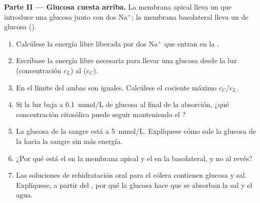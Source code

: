 \begin{problem}
\medskip
\noindent\textbf{Parte II --- Glucosa cuesta arriba.}
La membrana apical lleva un  que introduce una glucosa junto con
dos $\mathrm{Na^+}$; la membrana basolateral lleva un  de
glucosa ().
\begin{enumerate}[resume]
  \item Calcúlese la energía libre liberada por dos $\mathrm{Na^+}$ que
        entran en la .
  \item Escríbase la energía libre necesaria para llevar una glucosa desde
        la luz (concentración $c_L$) al  ($c_C$).
  \item En el límite del  ambas son iguales. Calcúlese el
        cociente máximo $c_C/c_L$.
  \item Si la luz baja a \qty{0.1}{mmol/L} de glucosa al final de la
        absorción, ¿qué concentración citosólica puede seguir manteniendo
        el ?
  \item La glucosa de la sangre está a \qty{5}{mmol/L}. Explíquese cómo
        sale la glucosa de la  hacia la sangre sin más energía.
  \item ¿Por qué está el  en la membrana apical y el
         en la basolateral, y no al revés?
  \item Las soluciones de rehidratación oral para el cólera contienen
        glucosa y sal. Explíquese, a partir del , por qué la
        glucosa hace que se absorban la sal y el agua.
\end{enumerate}


\end{problem}

